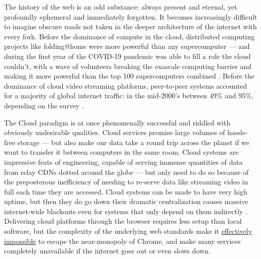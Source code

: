 The history of the web is an odd substance: always present and eternal,
yet profoundly ephemeral and immediately forgotten. It becomes
increasingly difficult to imagine obscure roads not taken in the deeper
architecture of the internet with every fork. Before the
dominance of compute in the cloud, distributed computing projects like
folding@home were more powerful than any supercomputer \cite{v.FileFoldingHome2012}  --- and during the first year of the COVID-19
pandemic was able to fill a role the cloud couldn't, with a wave of
volunteers breaking the exascale computing barrier and making it more
powerful than the top 100 supercomputers combined \cite{zimmermanSARSCoV2SimulationsGo2021} . Before the dominance of cloud
video streaming platforms, peer-to-peer systems accounted for a majority
of global internet traffic: in the mid-2000's between 49\% and 95\%,
depending on the survey \cite{vandersarBitTorrentOneThird2006, vandersarP2PTrafficBooming2007} .

The Cloud paradigm is at once phenomenally successful and riddled with
obviously undesirable qualities. Cloud services promise large volumes of
hassle-free storage --- but also make our data take a round trip across
the planet if we want to transfer it between computers in the same room.
Cloud systems are impressive feats of engineering, capable of serving
immense quantities of data from relay CDNs dotted around the globe ---
but only need to do so because of the preposterous inefficiency of
needing to re-serve data like streaming video in full each time they are
accessed. Cloud systems can be made to have very high uptime, but then
they do go down their dramatic centralization causes massive
internet-wide blackouts even for systems that only depend on them
indirectly \cite{lawlerAmazonServerOutage2021, hutchinsonAmazonWebServices2012} . Delivering cloud platforms through
the browser requires less setup than local software, but the complexity
of the underlying web standards make it
\href{https://drewdevault.com/2020/03/18/Reckless-limitless-scope.html}{effectively
impossible} \cite{devaultRecklessInfiniteScope2020}  to escape
the near-monopoly of
Chrome, and make many services completely
unavailable if the internet goes out or even slows down.

